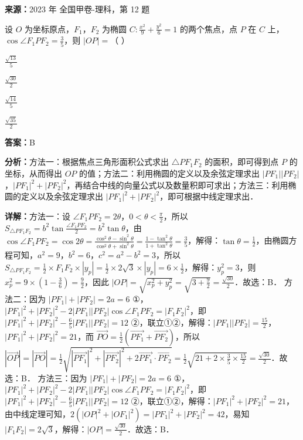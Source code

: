 \begin{question}[points=5]
\textbf{来源：}2023 年 全国甲卷-理科，第 12 题\par
设 $O$ 为坐标原点，$F_1$，$F_2$ 为椭圆 $C: \frac{x^2}{9} + \frac{y^2}{6} = 1$ 的两个焦点，点 $P$ 在 $C$ 上，$\cos\angle F_1PF_2 = \frac{3}{5}$，则 $|OP| = $（         ）
\begin{choices}
  \item $\frac{\sqrt{13}}{5}$
  \item $\frac{\sqrt{30}}{2}$
  \item $\frac{\sqrt{14}}{5}$
  \item $\frac{\sqrt{35}}{2}$
\end{choices}
\begin{solution}
\textbf{答案：}B

\textbf{分析：}方法一：根据焦点三角形面积公式求出 $\triangle PF_1F_2$ 的面积，即可得到点 $P$ 的坐标，从而得出 $OP$ 的值；方法二：利用椭圆的定义以及余弦定理求出 $|PF_1||PF_2|$，$|PF_1|^2+|PF_2|^2$，再结合中线的向量公式以及数量积即可求出；方法三：利用椭圆的定义以及余弦定理求出 $|PF_1|^2+|PF_2|^2$，即可根据中线定理求出．

\textbf{详解：}方法一：设 $\angle F_1PF_2 = 2\theta$，$0<\theta<\frac{\pi}{2}$，所以 $S_{\triangle PF_1F_2} = b^2\tan\frac{\angle F_1PF_2}{2} = b^2\tan\theta$，由 $\cos\angle F_1PF_2 = \cos2\theta = \frac{\cos^2\theta-\sin^2\theta}{\cos^2\theta+\sin^2\theta} = \frac{1-\tan^2\theta}{1+\tan^2\theta} = \frac{3}{5}$，解得：$\tan\theta = \frac{1}{2}$，由椭圆方程可知，$a^2=9$，$b^2=6$，$c^2=a^2-b^2=3$，所以 $S_{\triangle PF_1F_2} = \frac{1}{2}\times F_1F_2\times|y_p| = \frac{1}{2}\times2\sqrt{3}\times|y_p| = 6\times\frac{1}{2}$，解得：$y_p^2=3$，则 $x_p^2 = 9\times\left(1-\frac{3}{6}\right) = \frac{9}{2}$，因此 $|OP| = \sqrt{x_p^2+y_p^2} = \sqrt{3+\frac{9}{2}} = \frac{\sqrt{30}}{2}$．故选：B．
方法二：因为 $|PF_1|+|PF_2|=2a=6$ ①，$|PF_1|^2+|PF_2|^2-2|PF_1||PF_2|\cos\angle F_1PF_2 = |F_1F_2|^2$，即 $|PF_1|^2+|PF_2|^2 - \frac{6}{5}|PF_1||PF_2| = 12$ ②，联立①②，解得：$|PF_1||PF_2| = \frac{15}{2}$，$|PF_1|^2+|PF_2|^2 = 21$，而 $\overrightarrow{PO} = \frac{1}{2}(\overrightarrow{PF_1}+\overrightarrow{PF_2})$，所以 $|\overrightarrow{OP}| = |\overrightarrow{PO}| = \frac{1}{2}\sqrt{|\overrightarrow{PF_1}|^2+|\overrightarrow{PF_2}|^2+2\overrightarrow{PF_1}\cdot\overrightarrow{PF_2}} = \frac{1}{2}\sqrt{21+2\times\frac{3}{5}\times\frac{15}{2}} = \frac{\sqrt{30}}{2}$．故选：B．
方法三：因为 $|PF_1|+|PF_2|=2a=6$ ①，$|PF_1|^2+|PF_2|^2-2|PF_1||PF_2|\cos\angle F_1PF_2 = |F_1F_2|^2$，即 $|PF_1|^2+|PF_2|^2 - \frac{6}{5}|PF_1||PF_2| = 12$ ②，联立①②，解得：$|PF_1|^2+|PF_2|^2 = 21$，由中线定理可知，$2(|OP|^2+|OF_1|^2) = |PF_1|^2+|PF_2|^2 = 42$，易知 $|F_1F_2| = 2\sqrt{3}$，解得：$|OP| = \frac{\sqrt{30}}{2}$．故选：B．
\end{solution}
\end{question}

